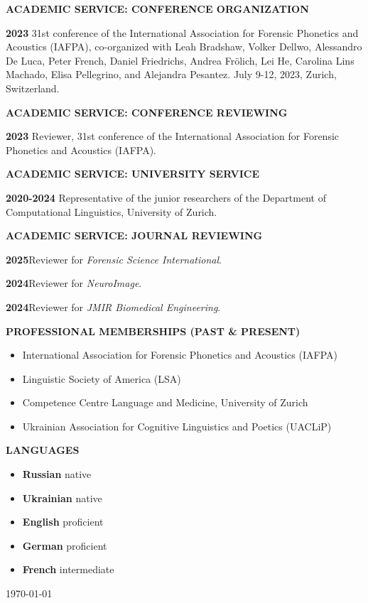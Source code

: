 \documentclass[11pt]{article}
\newcommand{\hangpara}{
 \setlength{\parindent}{0in} %
 \hangindent=0.42in %
}
\begin{document}
\vskip 20pt
\begin{flushleft}
{\bf ACADEMIC SERVICE: CONFERENCE ORGANIZATION}
\end{flushleft}
\hangpara
{\bf 2023}\hspace{1ex} 31st conference of the International Association for Forensic Phonetics and Acoustics (IAFPA), co-organized with Leah Bradshaw, Volker Dellwo, Alessandro De Luca, Peter French, Daniel Friedrichs, Andrea Frölich, Lei He, Carolina Lins Machado, Elisa Pellegrino, and Alejandra Pesantez. July 9-12, 2023, Zurich, Switzerland.


\vskip 20pt
\begin{flushleft}
{\bf ACADEMIC SERVICE: CONFERENCE REVIEWING}
\end{flushleft}
\hangpara
{\bf 2023}\hspace{1ex} Reviewer, 31st conference of the International Association for Forensic Phonetics and Acoustics (IAFPA).




\vskip 20pt
\begin{flushleft}
{\bf ACADEMIC SERVICE: UNIVERSITY SERVICE}
\end{flushleft}
\hangpara
{\bf 2020-2024}\hspace{1ex} Representative of the junior researchers of the Department of Computational Linguistics, University of Zurich.




\vskip 20pt
\begin{flushleft}
{\bf ACADEMIC SERVICE: JOURNAL REVIEWING}
\end{flushleft}
\hangpara
{\bf 2025}\hspace{1ex}Reviewer for \textit{Forensic Science International}.
\vskip 6pt
\hangpara
{\bf 2024}\hspace{1ex}Reviewer for \textit{NeuroImage}.
\vskip 6pt
\hangpara
{\bf 2024}\hspace{1ex}Reviewer for \textit{JMIR Biomedical Engineering}.



\vskip 20pt
\begin{flushleft}
{\bf PROFESSIONAL MEMBERSHIPS (PAST \& PRESENT)}
\end{flushleft}
\begin{itemize}
\item International Association for Forensic Phonetics and Acoustics (IAFPA)
\item Linguistic Society of America (LSA)
\item Competence Centre Language and Medicine, University of Zurich
\item Ukrainian Association for Cognitive Linguistics and Poetics (UACLiP)
\end{itemize}



\vskip 10pt
\begin{flushleft}
{\bf LANGUAGES}
\end{flushleft}
\begin{itemize}
\item {\bf Russian} native
\item {\bf Ukrainian} native
\item {\bf English} proficient
\item {\bf German} proficient
\item {\bf French} intermediate
\end{itemize}

\vskip 20pt
\today
\end{document}
